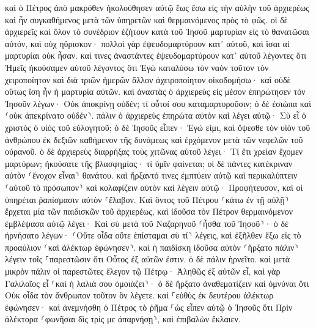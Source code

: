 \documentclass[twoside, 9pt]{extreport}
\begin{document}
καὶ ὁ Πέτρος ἀπὸ μακρόθεν ἠκολούθησεν αὐτῷ ἕως ἔσω εἰς τὴν αὐλὴν τοῦ ἀρχιερέως καὶ ἦν συγκαθήμενος μετὰ τῶν ὑπηρετῶν καὶ θερμαινόμενος πρὸς τὸ φῶς. 
οἱ δὲ ἀρχιερεῖς καὶ ὅλον τὸ συνέδριον ἐζήτουν κατὰ τοῦ Ἰησοῦ μαρτυρίαν εἰς τὸ θανατῶσαι αὐτόν, καὶ οὐχ ηὕρισκον· 
πολλοὶ γὰρ ἐψευδομαρτύρουν κατ᾽ αὐτοῦ, καὶ ἴσαι αἱ μαρτυρίαι οὐκ ἦσαν. 
καί τινες ἀναστάντες ἐψευδομαρτύρουν κατ᾽ αὐτοῦ λέγοντες 
ὅτι Ἡμεῖς ἠκούσαμεν αὐτοῦ λέγοντος ὅτι Ἐγὼ καταλύσω τὸν ναὸν τοῦτον τὸν χειροποίητον καὶ διὰ τριῶν ἡμερῶν ἄλλον ἀχειροποίητον οἰκοδομήσω· 
καὶ οὐδὲ οὕτως ἴση ἦν ἡ μαρτυρία αὐτῶν. 
καὶ ἀναστὰς ὁ ἀρχιερεὺς εἰς μέσον ἐπηρώτησεν τὸν Ἰησοῦν λέγων· Οὐκ ἀποκρίνῃ οὐδέν; τί οὗτοί σου καταμαρτυροῦσιν; 
ὁ δὲ ἐσιώπα καὶ ⸂οὐκ ἀπεκρίνατο οὐδέν⸃. πάλιν ὁ ἀρχιερεὺς ἐπηρώτα αὐτὸν καὶ λέγει αὐτῷ· Σὺ εἶ ὁ χριστὸς ὁ υἱὸς τοῦ εὐλογητοῦ; 
ὁ δὲ Ἰησοῦς εἶπεν· Ἐγώ εἰμι, καὶ ὄψεσθε τὸν υἱὸν τοῦ ἀνθρώπου ἐκ δεξιῶν καθήμενον τῆς δυνάμεως καὶ ἐρχόμενον μετὰ τῶν νεφελῶν τοῦ οὐρανοῦ. 
ὁ δὲ ἀρχιερεὺς διαρρήξας τοὺς χιτῶνας αὐτοῦ λέγει· Τί ἔτι χρείαν ἔχομεν μαρτύρων; 
ἠκούσατε τῆς βλασφημίας· τί ὑμῖν φαίνεται; οἱ δὲ πάντες κατέκριναν αὐτὸν ⸂ἔνοχον εἶναι⸃ θανάτου. 
καὶ ἤρξαντό τινες ἐμπτύειν αὐτῷ καὶ περικαλύπτειν ⸂αὐτοῦ τὸ πρόσωπον⸃ καὶ κολαφίζειν αὐτὸν καὶ λέγειν αὐτῷ· Προφήτευσον, καὶ οἱ ὑπηρέται ῥαπίσμασιν αὐτὸν ⸀ἔλαβον. 
Καὶ ὄντος τοῦ Πέτρου ⸂κάτω ἐν τῇ αὐλῇ⸃ ἔρχεται μία τῶν παιδισκῶν τοῦ ἀρχιερέως, 
καὶ ἰδοῦσα τὸν Πέτρον θερμαινόμενον ἐμβλέψασα αὐτῷ λέγει· Καὶ σὺ μετὰ τοῦ Ναζαρηνοῦ ⸂ἦσθα τοῦ Ἰησοῦ⸃· 
ὁ δὲ ἠρνήσατο λέγων· ⸂Οὔτε οἶδα οὔτε ἐπίσταμαι σὺ τί⸃ λέγεις, καὶ ἐξῆλθεν ἔξω εἰς τὸ προαύλιον ⸂καὶ ἀλέκτωρ ἐφώνησεν⸃. 
καὶ ἡ παιδίσκη ἰδοῦσα αὐτὸν ⸂ἤρξατο πάλιν⸃ λέγειν τοῖς ⸀παρεστῶσιν ὅτι Οὗτος ἐξ αὐτῶν ἐστιν. 
ὁ δὲ πάλιν ἠρνεῖτο. καὶ μετὰ μικρὸν πάλιν οἱ παρεστῶτες ἔλεγον τῷ Πέτρῳ· Ἀληθῶς ἐξ αὐτῶν εἶ, καὶ γὰρ Γαλιλαῖος εἶ ⸂καὶ ἡ λαλιά σου ὁμοιάζει⸃· 
ὁ δὲ ἤρξατο ἀναθεματίζειν καὶ ὀμνύναι ὅτι Οὐκ οἶδα τὸν ἄνθρωπον τοῦτον ὃν λέγετε. 
καὶ ⸀εὐθὺς ἐκ δευτέρου ἀλέκτωρ ἐφώνησεν· καὶ ἀνεμνήσθη ὁ Πέτρος τὸ ῥῆμα ⸀ὡς εἶπεν αὐτῷ ὁ Ἰησοῦς ὅτι Πρὶν ἀλέκτορα ⸂φωνῆσαι δὶς τρίς με ἀπαρνήσῃ⸃, καὶ ἐπιβαλὼν ἔκλαιεν. 
\end{document}
